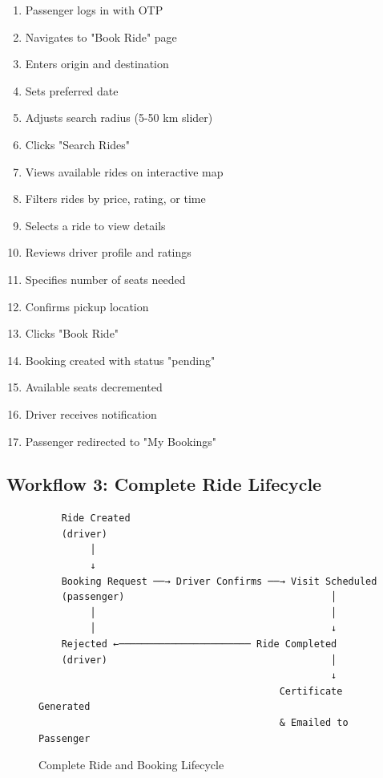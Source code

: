 \documentclass[12pt,a4paper]{article}
\begin{document}
\begin{enumerate}
    \item Passenger logs in with OTP
    \item Navigates to "Book Ride" page
    \item Enters origin and destination
    \item Sets preferred date
    \item Adjusts search radius (5-50 km slider)
    \item Clicks "Search Rides"
    \item Views available rides on interactive map
    \item Filters rides by price, rating, or time
    \item Selects a ride to view details
    \item Reviews driver profile and ratings
    \item Specifies number of seats needed
    \item Confirms pickup location
    \item Clicks "Book Ride"
    \item Booking created with status "pending"
    \item Available seats decremented
    \item Driver receives notification
    \item Passenger redirected to "My Bookings"
\end{enumerate}

\subsection{Workflow 3: Complete Ride Lifecycle}

\begin{figure}[H]
    \centering
    \begin{verbatim}
    Ride Created
    (driver)
         │
         ↓
    Booking Request ──→ Driver Confirms ──→ Visit Scheduled
    (passenger)                                    │
         │                                         │
         │                                         ↓
    Rejected ←─────────────────────── Ride Completed
    (driver)                                       │
                                                   ↓
                                          Certificate Generated
                                          & Emailed to Passenger
    \end{verbatim}
    \caption{Complete Ride and Booking Lifecycle}
\end{figure}
\end{document}
